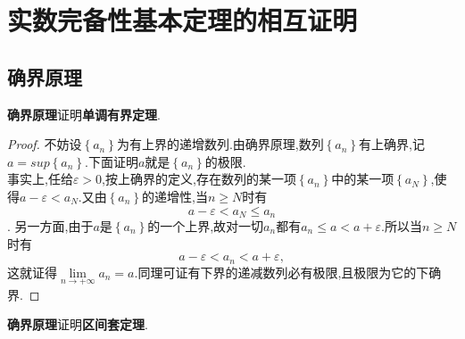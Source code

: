 \chapter{实数完备性基本定理的相互证明}

\section{确界原理}

\begin{example}
	\textbf{确界原理}证明\textbf{单调有界定理}.
\end{example}

\begin{proof}
	不妨设$\left\lbrace a_n \right\rbrace $为有上界的递增数列.由确界原理,数列$\left\lbrace a_n \right\rbrace $有上确界,记$a = sup\left\lbrace a_n \right\rbrace$.下面证明$a$就是$\left\lbrace a_n \right\rbrace$的极限.\\
	事实上,任给$\varepsilon > 0$,按上确界的定义,存在数列的某一项$\left\lbrace a_n \right\rbrace$中的某一项$\left\lbrace a_N \right\rbrace$,使得$a-\varepsilon<a_N$.又由$\left\lbrace a_n \right\rbrace$的递增性,当$n \geq N$时有$$a-\varepsilon<a_N \le a_n$$.
	另一方面,由于$a$是$\left\lbrace a_n \right\rbrace$的一个上界,故对一切$a_n$都有$a_n \le a < a + \varepsilon$.所以当$n \geq N$时有$$a-\varepsilon<a_n<a+\varepsilon,$$这就证得$\lim\limits_{n\rightarrow +\infty}a_n =a$.同理可证有下界的递减数列必有极限,且极限为它的下确界.
\end{proof}

\begin{example}
	\textbf{确界原理}证明\textbf{区间套定理}.
\end{example}
